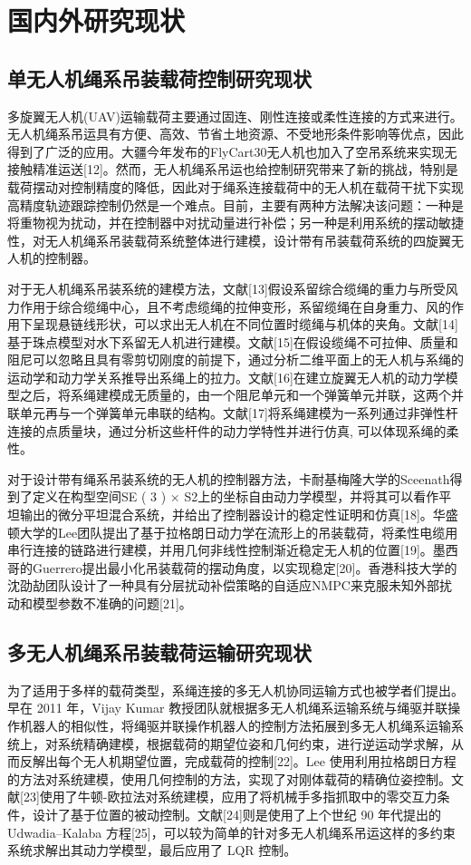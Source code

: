 \documentclass[lang=chs, degree=master, blindreview=false, winfonts=true]{yanputhesis}
\begin{document}
\section{国内外研究现状}
\subsection{单无人机绳系吊装载荷控制研究现状}
多旋翼无人机(UAV)运输载荷主要通过固连、刚性连接或柔性连接的方式来进行。无人机绳系吊运具有方便、高效、节省土地资源、不受地形条件影响等优点，因此得到了广泛的应用。大疆今年发布的FlyCart30无人机也加入了空吊系统来实现无接触精准运送[12]。然而，无人机绳系吊运也给控制研究带来了新的挑战，特别是载荷摆动对控制精度的降低，因此对于绳系连接载荷中的无人机在载荷干扰下实现高精度轨迹跟踪控制仍然是一个难点。目前，主要有两种方法解决该问题：一种是将重物视为扰动，并在控制器中对扰动量进行补偿；另一种是利用系统的摆动敏捷性，对无人机绳系吊装载荷系统整体进行建模，设计带有吊装载荷系统的四旋翼无人机的控制器。

对于无人机绳系吊装系统的建模方法，文献[13]假设系留综合缆绳的重力与所受风力作用于综合缆绳中心，且不考虑缆绳的拉伸变形，系留缆绳在自身重力、风的作用下呈现悬链线形状，可以求出无人机在不同位置时缆绳与机体的夹角。文献[14]基于珠点模型对水下系留无人机进行建模。文献[15]在假设缆绳不可拉伸、质量和阻尼可以忽略且具有零剪切刚度的前提下，通过分析二维平面上的无人机与系绳的运动学和动力学关系推导出系绳上的拉力。文献[16]在建立旋翼无人机的动力学模型之后，将系绳建模成无质量的，由一个阻尼单元和一个弹簧单元并联，这两个并联单元再与一个弹簧单元串联的结构。文献[17]将系绳建模为一系列通过非弹性杆连接的点质量块，通过分析这些杆件的动力学特性并进行仿真, 可以体现系绳的柔性。

对于设计带有绳系吊装系统的无人机的控制器方法，卡耐基梅隆大学的Sceenath得到了定义在构型空间SE ( 3 ) × S2上的坐标自由动力学模型，并将其可以看作平坦输出的微分平坦混合系统，并给出了控制器设计的稳定性证明和仿真[18]。华盛顿大学的Lee团队提出了基于拉格朗日动力学在流形上的吊装载荷，将柔性电缆用串行连接的链路进行建模，并用几何非线性控制渐近稳定无人机的位置[19]。墨西哥的Guerrero提出最小化吊装载荷的摆动角度，以实现稳定[20]。香港科技大学的沈劭劼团队设计了一种具有分层扰动补偿策略的自适应NMPC来克服未知外部扰动和模型参数不准确的问题[21]。


\subsection{多无人机绳系吊装载荷运输研究现状}
为了适用于多样的载荷类型，系绳连接的多无人机协同运输方式也被学者们提出。早在 2011 年，Vijay Kumar 教授团队就根据多无人机绳系运输系统与绳驱并联操作机器人的相似性，将绳驱并联操作机器人的控制方法拓展到多无人机绳系运输系统上，对系统精确建模，根据载荷的期望位姿和几何约束，进行逆运动学求解，从而反解出每个无人机期望位置，完成载荷的控制[22]。Lee 使用利用拉格朗日方程的方法对系统建模，使用几何控制的方法，实现了对刚体载荷的精确位姿控制。文献[23]使用了牛顿-欧拉法对系统建模，应用了将机械手多指抓取中的零交互力条件，设计了基于位置的被动控制。文献[24]则是使用了上个世纪 90 年代提出的 Udwadia–Kalaba 方程[25]，可以较为简单的针对多无人机绳系吊运这样的多约束系统求解出其动力学模型，最后应用了 LQR 控制。
\end{document}
